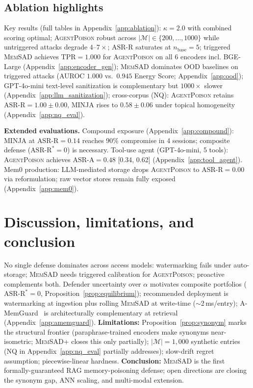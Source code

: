 \documentclass{article}
\theoremstyle{definition}
\newcommand{\asrr}{\text{ASR-R}}
\newcommand{\asra}{\text{ASR-A}}
\newcommand{\tpr}{\text{TPR}}
\newcommand{\cM}{\mathcal{M}}
\newcommand{\memsad}{\textnormal{\textsc{MemSAD}}}
\newcommand{\agentpoison}{\textsc{AgentPoison}}
\newcommand{\minja}{\textsc{MINJA}}
\begin{document}
\subsection{Ablation highlights}

Key results (full tables in Appendix~\ref{app:ablation}): $\kappa = 2.0$ with combined scoring optimal; \agentpoison{} robust across $|\cM|\in\{200,\ldots,1000\}$ while untriggered attacks degrade $4$--$7\times$; $\asrr$ saturates at $n_{\text{base}}{=}5$; triggered \memsad{} achieves $\tpr=1.000$ for \agentpoison{} on all 6 encoders incl. BGE-Large (Appendix~\ref{app:encoder_gen}); \memsad{} dominates OOD baselines on triggered attacks (AUROC $1.000$ vs.\ $0.945$ Energy Score; Appendix~\ref{app:ood}); GPT-4o-mini text-level sanitization is complementary but $1000\times$ slower (Appendix~\ref{app:llm_sanitization}); cross-corpus (NQ): \agentpoison{} retains $\asrr=1.00\pm 0.00$, \minja{} rises to $0.58\pm 0.06$ under topical homogeneity (Appendix~\ref{app:nq_eval}).

\textbf{Extended evaluations.} Compound exposure (Appendix~\ref{app:compound}): \minja{} at $\asrr=0.14$ reaches 90\% compromise in 4 sessions; composite defense ($\asrr^*=0$) is necessary. Tool-use agent (GPT-4o-mini, 5 tools): \agentpoison{} achieves $\asra=0.48$ [0.34, 0.62] (Appendix~\ref{app:tool_agent}). Mem0 production: LLM-mediated storage drops \agentpoison{} to $\asrr=0.00$ via reformulation; raw vector stores remain fully exposed (Appendix~\ref{app:mem0}).

\section{Discussion, limitations, and conclusion}
\label{sec:discussion}

No single defense dominates across access models: watermarking fails under auto-storage; \memsad{} needs triggered calibration for \agentpoison{}; proactive complements both. Defender uncertainty over $\alpha$ motivates composite portfolios ($\asrr^*=0$, Proposition~\ref{prop:equilibrium}); recommended deployment is watermarking at ingestion plus rolling \memsad{} at write-time ($\sim$2\,ms/entry); A-MemGuard~\citep{amemguard2025} is architecturally complementary at retrieval (Appendix~\ref{app:amemguard}). \textbf{Limitations:} Proposition~\ref{prop:synonym} marks the structural frontier (paraphrase-trained encoders make synonyms near-isometric; \memsad{}+ closes this only partially); $|\cM|{=}1{,}000$ synthetic entries (NQ in Appendix~\ref{app:nq_eval} partially addresses); slow-drift regret assumption; piecewise-linear hardness. \textbf{Conclusion:} \memsad{} is the first formally-guaranteed RAG memory-poisoning defense; open directions are closing the synonym gap, ANN scaling, and multi-modal extension.
\end{document}
